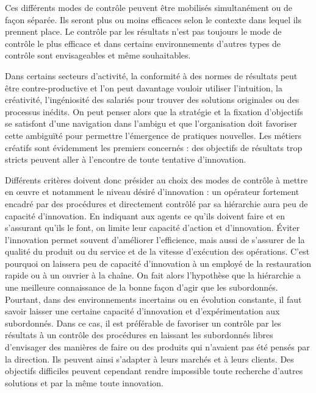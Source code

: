 \documentclass[oneside]{kaobook}
\begin{document}
Ces différents modes de contrôle peuvent être mobilisés simultanément ou de façon séparée. Ils seront plus ou moins efficaces selon le contexte dans lequel ils prennent place. Le contrôle par les résultats n'est pas toujours le mode de contrôle le plus efficace et dans certains environnements d'autres types de contrôle sont envisageables et même souhaitables. 

\begin{kaobox}
Dans certains secteurs d’activité, la conformité à des normes de résultats peut être contre-productive et l’on peut davantage vouloir utiliser l’intuition, la créativité, l’ingéniosité des salariés pour trouver des solutions originales ou des processus inédits. On peut penser alors que la stratégie et la fixation d’objectifs se satisfont d’une navigation dans l’ambigu et que l’organisation doit favoriser cette ambiguïté pour permettre l’émergence de pratiques nouvelles. Les métiers créatifs sont évidemment les premiers concernés : des objectifs de résultats trop stricts peuvent aller à l’encontre de toute tentative d’innovation.

Différents critères doivent donc présider au choix des modes de contrôle à mettre en œuvre et notamment le niveau désiré d’innovation : un opérateur fortement encadré par des procédures et directement contrôlé par sa hiérarchie aura peu de capacité d’innovation. En indiquant aux agents ce qu’ils doivent faire et en s’assurant qu’ils le font, on limite leur capacité d’action et d’innovation. Éviter l’innovation permet souvent d’améliorer l’efficience, mais aussi de s’assurer de la qualité du produit ou du service et de la vitesse d’exécution des opérations. C’est pourquoi on laissera peu de capacité d’innovation à un employé de la restauration rapide ou à un ouvrier à la chaîne. On fait alors l’hypothèse que la hiérarchie a une meilleure connaissance de la bonne façon d’agir que les subordonnés. Pourtant, dans des environnements incertains ou en évolution constante, il faut savoir laisser une certaine capacité d’innovation et d’expérimentation aux subordonnés. Dans ce cas, il est préférable de favoriser un contrôle par les résultats à un contrôle des procédures en laissant les subordonnés libres d’envisager des manières de faire ou des produits qui n’avaient pas été pensés par la direction. Ils peuvent ainsi s’adapter à leurs marchés et à leurs clients. Des objectifs difficiles peuvent cependant rendre impossible toute recherche d’autres solutions et par la même toute innovation.
\end{kaobox}
\end{document}
